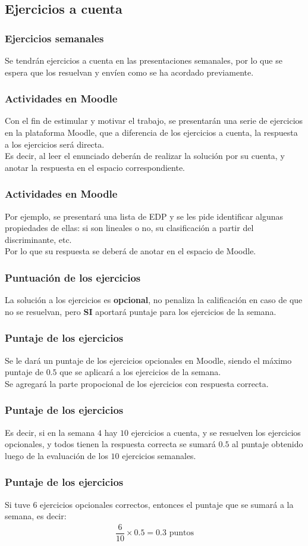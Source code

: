 \documentclass[12pt]{beamer}
\begin{document}
\subsection{Ejercicios a cuenta}
\begin{frame}
\frametitle{Ejercicios semanales}
Se tendrán ejercicios a cuenta en las presentaciones semanales, por lo que se espera que los resuelvan y envíen como se ha acordado previamente.
\end{frame}
\begin{frame}
\frametitle{Actividades en Moodle}
Con el fin de estimular y motivar el trabajo, se presentarán una serie de ejercicios en la plataforma Moodle, que a diferencia de los ejercicios a cuenta, la respuesta a los ejercicios será directa.
\\
\bigskip
Es decir, al leer el enunciado deberán de realizar la solución por su cuenta, y anotar la respuesta en el espacio correspondiente.
\end{frame}
\begin{frame}
\frametitle{Actividades en Moodle}
Por ejemplo, se presentará una lista de EDP y se les pide identificar algunas propiedades de ellas: si son lineales o no, su clasificación a partir del discriminante, etc.
\\
\bigskip
Por lo que su respuesta se deberá de anotar en el espacio de Moodle.
\end{frame}
\begin{frame}
\frametitle{Puntuación de los ejercicios}
La solución a los ejercicios es \textbf{opcional}, no penaliza la calificación en caso de que no se resuelvan, pero \textbf{SI} aportará puntaje para los ejercicios de la semana.
\end{frame}
\begin{frame}
\frametitle{Puntaje de los ejercicios}
Se le dará un puntaje de los ejercicios opcionales en Moodle, siendo el máximo puntaje de $0.5$ que se aplicará a los ejercicios de la semana.
\\
\bigskip
\pause
Se agregará la parte propocional de los ejercicios con respuesta correcta.
\end{frame}
\begin{frame}
\frametitle{Puntaje de los ejercicios}
Es decir, si en la semana $4$ hay $10$ ejercicios a cuenta, y se resuelven los ejercicios opcionales, y todos tienen la respuesta correcta se sumará $0.5$ al puntaje obtenido luego de la evaluación de los $10$ ejercicios semanales.
\end{frame}
\begin{frame}
\frametitle{Puntaje de los ejercicios}
Si tuve 6 ejercicios opcionales correctos, entonces el puntaje que se sumará a la semana, es decir: 
\begin{align*}
\dfrac{6}{10} \times 0.5 = 0.3 \mbox{ puntos}
\end{align*}
\end{frame}
\end{document}
